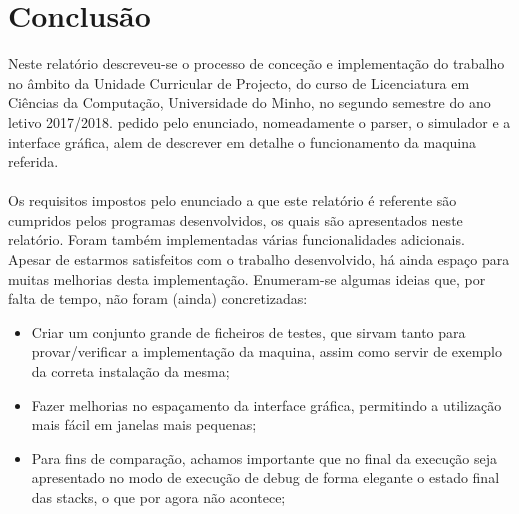 \documentclass{report}
\begin{document}
\chapter{Conclusão} \label{concl}
\quad Neste relatório descreveu-se o processo de conceção e implementação do trabalho no
âmbito da Unidade Curricular de Projecto, do curso de Licenciatura em Ciências da Computação, Universidade do Minho, no
segundo semestre do ano letivo 2017/2018. pedido pelo
enunciado, nomeadamente o parser, o simulador e a interface gráfica, alem de descrever em detalhe
o funcionamento da maquina referida.\\\\
\null\quad Os requisitos impostos pelo enunciado a que este relatório é referente são cumpridos pelos programas desenvolvidos,
os quais são apresentados neste relatório. Foram também implementadas várias funcionalidades adicionais.\\
\null\quad Apesar de estarmos satisfeitos com o trabalho desenvolvido, há ainda espaço para muitas
melhorias desta implementação. Enumeram-se algumas ideias que, por falta de tempo, não foram
(ainda) concretizadas:

\begin{itemize}
\item Criar um conjunto grande de ficheiros de testes, que sirvam tanto para provar/verificar a
implementação da maquina, assim como servir de exemplo da correta instalação da mesma;
\item Fazer melhorias no espaçamento da interface gráfica, permitindo a utilização mais fácil em janelas mais pequenas;
\item Para fins de comparação, achamos importante que no final da execução seja apresentado no modo de execução de debug
 de forma elegante o estado final das stacks, o que por agora não acontece;
\end{itemize}

%
%
\end{document}
